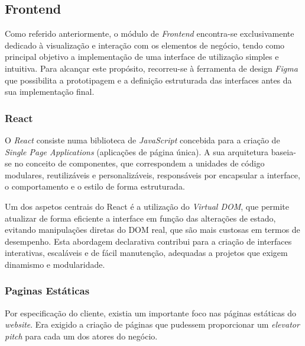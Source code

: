 \subsection{Frontend}

Como referido anteriormente, o módulo de \textit{Frontend} encontra-se exclusivamente dedicado à visualização e interação com os elementos de negócio, tendo como principal objetivo a implementação de uma interface de utilização simples e intuitiva. Para alcançar este propósito, recorreu-se à ferramenta de design  \textit{Figma} que possibilita a prototipagem e a definição estruturada das interfaces antes da sua implementação final.

\subsubsection{React}

O \textit{React} consiste numa biblioteca de \textit{JavaScript} concebida para a criação de \textit{Single Page Applications} (aplicações de página única). A sua arquitetura baseia-se no conceito de componentes, que correspondem a unidades de código modulares, reutilizáveis e personalizáveis, responsáveis por encapsular a interface, o comportamento e o estilo de forma estruturada.

Um dos aspetos centrais do React é a utilização do \textit{Virtual DOM}, que permite atualizar de forma eficiente a interface em função das alterações de estado, evitando manipulações diretas do DOM real, que são mais custosas em termos de desempenho. Esta abordagem declarativa contribui para a criação de interfaces interativas, escaláveis e de fácil manutenção, adequadas a projetos que exigem dinamismo e modularidade.


\subsubsection{Paginas Estáticas}

Por especificação do cliente, existia um importante foco nas páginas estáticas do \textit{website}. Era exigido a criação de páginas que pudessem proporcionar um \textit{elevator pitch} para cada um dos atores do negócio.

